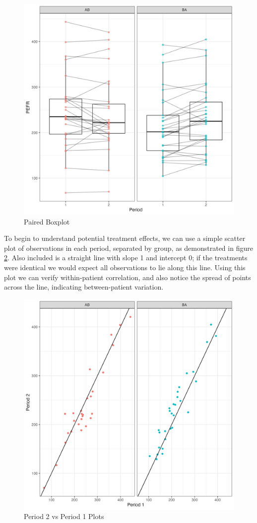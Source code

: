 \documentclass[12pt, TexShade, letterpaper]{report}
\begin{document}
\begin{figure}[ht]
    \centering
    \includegraphics[width=0.85\linewidth]{report/figures/ch2/pairedBoxplot.png}
    \caption{Paired Boxplot}
    \label{fig:pairedboxplot}
\end{figure}

To begin to understand potential treatment effects, we can use a simple scatter plot of observations in each period, separated by group, as demonstrated in figure \ref{fig:period2vsperiod1}. Also included is a straight line with slope 1 and intercept 0; if the treatments were identical we would expect all observations to lie along this line. Using this plot we can verify within-patient correlation, and also notice the spread of points across the line, indicating between-patient variation.

\begin{figure}[ht]
    \centering
    \includegraphics[width=0.85\linewidth]{report/figures/ch2/periodsPlot.png}
    \caption{Period 2 vs Period 1 Plots}
    \label{fig:period2vsperiod1}
\end{figure}
\end{document}
